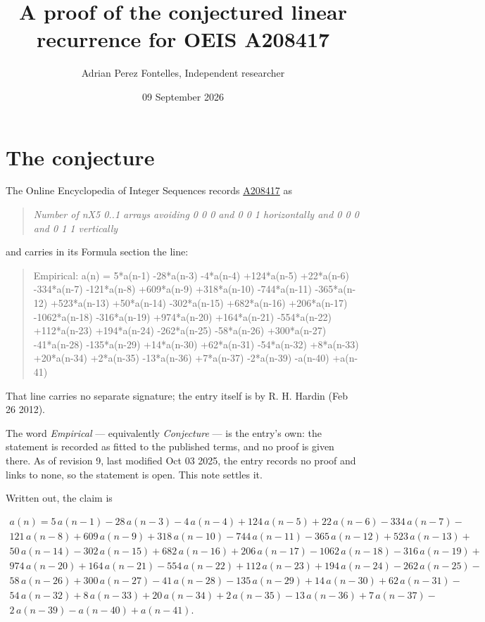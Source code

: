 \documentclass[11pt]{article}
\title{A proof of the conjectured linear recurrence for OEIS A208417}
\author{Adrian Perez Fontelles, Independent researcher}
\date{09 September 2026}
\theoremstyle{definition}
\begin{document}
\maketitle
\section{The conjecture}

The Online Encyclopedia of Integer Sequences records \href{https://oeis.org/A208417}{A208417} as

\begin{quote}\itshape Number of nX5 0..1 arrays avoiding 0 0 0 and 0 0 1 horizontally and 0 0 0 and 0 1 1 vertically\end{quote}

and carries in its Formula section the line:

\begin{quote}\ttfamily Empirical: a(n) = 5*a(n-1) -28*a(n-3) -4*a(n-4) +124*a(n-5) +22*a(n-6) -334*a(n-7) -121*a(n-8) +609*a(n-9) +318*a(n-10) -744*a(n-11) -365*a(n-12) +523*a(n-13) +50*a(n-14) -302*a(n-15) +682*a(n-16) +206*a(n-17) -1062*a(n-18) -316*a(n-19) +974*a(n-20) +164*a(n-21) -554*a(n-22) +112*a(n-23) +194*a(n-24) -262*a(n-25) -58*a(n-26) +300*a(n-27) -41*a(n-28) -135*a(n-29) +14*a(n-30) +62*a(n-31) -54*a(n-32) +8*a(n-33) +20*a(n-34) +2*a(n-35) -13*a(n-36) +7*a(n-37) -2*a(n-39) -a(n-40) +a(n-41)\end{quote}

That line carries no separate signature; the entry itself is by R. H. Hardin (Feb 26 2012).

The word {\itshape Empirical} --- equivalently {\itshape Conjecture} --- is the entry's own: the statement is recorded as fitted to the published terms, and no proof is given there. As of revision 9, last modified Oct 03 2025, the entry records no proof and links to none, so the statement is open. This note settles it.

Written out, the claim is

\begin{multline*} a(n) = 5\,a(n-1) - 28\,a(n-3) - 4\,a(n-4) + 124\,a(n-5) + 22\,a(n-6) - 334\,a(n-7) - \\ 121\,a(n-8) + 609\,a(n-9) + 318\,a(n-10) - 744\,a(n-11) - 365\,a(n-12) + 523\,a(n-13) + \\ 50\,a(n-14) - 302\,a(n-15) + 682\,a(n-16) + 206\,a(n-17) - 1062\,a(n-18) - 316\,a(n-19) + \\ 974\,a(n-20) + 164\,a(n-21) - 554\,a(n-22) + 112\,a(n-23) + 194\,a(n-24) - 262\,a(n-25) - \\ 58\,a(n-26) + 300\,a(n-27) - 41\,a(n-28) - 135\,a(n-29) + 14\,a(n-30) + 62\,a(n-31) - \\ 54\,a(n-32) + 8\,a(n-33) + 20\,a(n-34) + 2\,a(n-35) - 13\,a(n-36) + 7\,a(n-37) - \\ 2\,a(n-39) - a(n-40) + a(n-41). \end{multline*}
\end{document}
